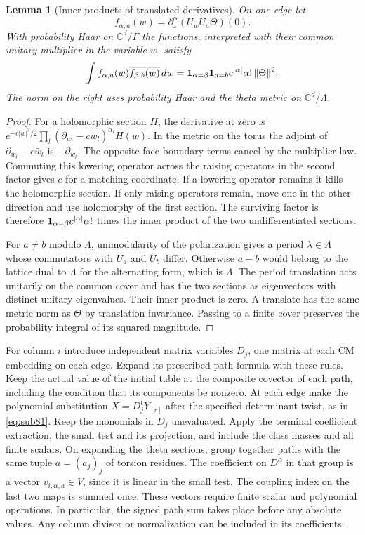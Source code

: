 \documentclass[a4paper,11pt]{article}
\newtheorem{lemma}[proposition]{Lemma}
\theoremstyle{definition}
\theoremstyle{remark}
\numberwithin{equation}{section}
\begin{document}
\begin{lemma}[Inner products of translated derivatives]\leavevmode
\label{lem:translatedjets478}
On one edge let
\[
 f_{\alpha,a}(w)=\partial_z^\alpha
                   (U_w U_a\Theta)(0).
\]
With probability Haar on \(\mathbb C^d/\Gamma\) the functions,
interpreted with their common unitary multiplier in the variable
\(w\), satisfy
\[
 \int f_{\alpha,a}(w)\overline{f_{\beta,b}(w)}\,dw
  ={\bf1}_{\alpha=\beta}{\bf1}_{a=b}
              c^{|\alpha|}\alpha!\,\|\Theta\|^2 .
\]
The norm on the right uses probability Haar and the theta metric
on \(\mathbb C^d/\Lambda\).
\end{lemma}
\begin{proof}
For a holomorphic section \(H\), the derivative at zero is
\(e^{-c|w|^2/2}\prod_l(\partial_{w_l}-c\bar w_l)^{\alpha_l}H(w)\).
In the metric on the torus the adjoint of
\(\partial_{w_l}-c\bar w_l\) is \(-\partial_{\bar w_l}\).
The opposite-face boundary terms cancel by the multiplier law.
Commuting this lowering operator across the raising operators in
the second factor gives \(c\) for a matching coordinate.
If a lowering operator remains it kills the holomorphic section.
If only raising operators remain, move one in the other direction
and use holomorphy of the first section. The surviving factor is
therefore \({\bf1}_{\alpha=\beta}c^{|\alpha|}\alpha!\) times the
inner product of the two undifferentiated sections.

For \(a\ne b\) modulo \(\Lambda\), unimodularity of the polarization
gives a period \(\lambda\in\Lambda\) whose commutators with \(U_a\)
and \(U_b\) differ. Otherwise \(a-b\) would belong to the lattice
dual to \(\Lambda\) for the alternating form, which is \(\Lambda\).
The period translation acts unitarily on the common cover and has
the two sections as eigenvectors with distinct unitary eigenvalues.
Their inner product is zero. A translate has the same metric norm
as \(\Theta\) by translation invariance. Passing to a finite cover
preserves the probability integral of its squared magnitude.
\end{proof}

For column \(i\) introduce independent matrix variables \(D_j\),
one matrix at each CM embedding on each edge. Expand its prescribed
path formula with these rules. Keep the actual value of the
initial table at the composite covector of each path, including
the condition that its components be nonzero. At each edge make
the polynomial substitution \(X=D_j^{\mathsf t}Y_{[r]}\) after
the specified determinant twist, as in \eqref{eq:sub81}. Keep the
monomials in \(D_j\) unevaluated. Apply the terminal coefficient
extraction, the small test and its projection, and include the
class masses and all finite scalars. On expanding the theta
sections, group together paths with the same tuple \(a=(a_j)_j\)
of torsion residues. The coefficient on \(D^\alpha\) in that
group is a vector \(v_{i,\alpha,a}\in V\), since it is linear
in the small test. The coupling index on the last two maps is
summed once. These vectors require finite scalar and polynomial
operations. In particular, the signed path sum takes place
before any absolute values. Any column divisor or normalization
can be included in its coefficients.
\end{document}
